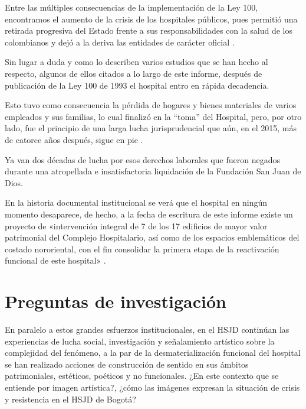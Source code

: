 Entre las múltiples consecuencias de la implementación de la Ley 100, encontramos el aumento de la crisis de los hospitales públicos, pues permitió una retirada progresiva del Estado frente a sus responsabilidades con la salud de los colombianos y dejó a la deriva las entidades de carácter oficial \parencite{Castiblanco2017}.

Sin lugar a duda y como lo describen varios estudios que se han hecho al respecto, algunos de ellos citados a lo largo de este informe, después de publicación de la Ley 100 de 1993 el hospital entro en rápida decadencia.

Esto tuvo como consecuencia la pérdida de hogares y bienes materiales de varios empleados y sus familias, lo cual finalizó en la “toma” del Hospital, pero, por otro lado, fue el principio de una larga lucha jurisprudencial que aún, en el 2015, más de catorce años después, sigue en pie \parencite{Orlando2015}.

Ya van dos décadas de lucha por esos derechos laborales que fueron negados durante una atropellada e insatisfactoria liquidación de la Fundación San Juan de Dios. 

En la historia documental institucional se verá que el hospital en ningún momento desaparece, de hecho, a la fecha de escritura de este informe existe un proyecto de «intervención integral de 7 de los 17 edificios de mayor valor patrimonial del Complejo Hospitalario, así como de los espacios emblemáticos del costado nororiental, con el fin consolidar la primera etapa de la reactivación funcional de este hospital» .

\section*{Preguntas de investigación}
En paralelo a estos grandes esfuerzos institucionales, en el HSJD continúan las experiencias de lucha social, investigación y señalamiento artístico sobre la complejidad del fenómeno, a la par de la desmaterialización funcional del hospital se han realizado acciones de construcción de sentido en sus ámbitos patrimoniales, estéticos, poéticos y no funcionales. ¿En este contexto que se entiende por imagen artística?, ¿cómo las imágenes expresan la situación de crisis y resistencia en el HSJD de Bogotá?